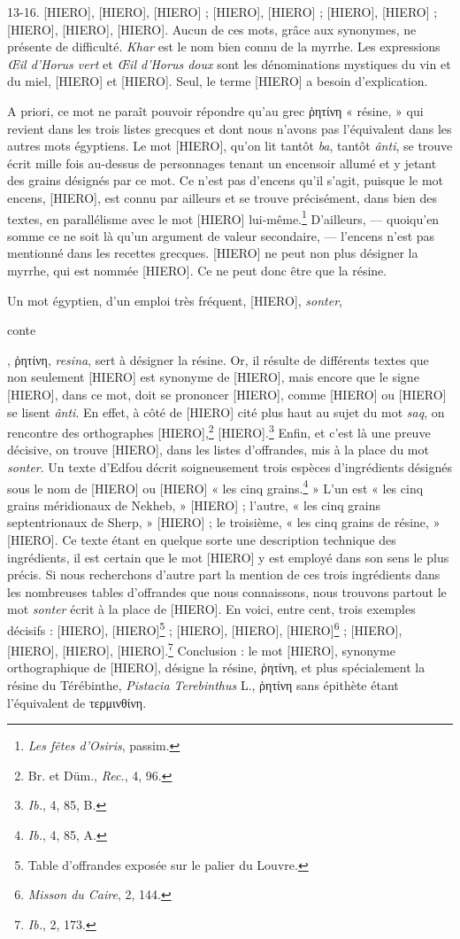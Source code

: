 \documentclass[a4paper, 11pt, oneside, landscape]{article}
\begin{document}
13-16. [HIERO], [HIERO], [HIERO] ; [HIERO], [HIERO] ; [HIERO], [HIERO] ; [HIERO], [HIERO], [HIERO]. Aucun de ces mots, grâce aux synonymes, ne présente de difficulté. \emph{Khar} est le nom bien connu de la myrrhe. Les expressions \emph{Œil d'Horus vert} et \emph{Œil d'Horus doux} sont les dénominations mystiques du vin et du miel, [HIERO] et [HIERO]. Seul, le terme [HIERO] a besoin d'explication.

A priori, ce mot ne paraît pouvoir répondre qu'au grec ῥητίνη « résine, » qui revient dans les trois listes grecques et dont nous n'avons pas l'équivalent dans les autres mots égyptiens. Le mot [HIERO], qu'on lit tantôt \emph{ba}, tantôt \emph{ânti}, se trouve écrit mille fois au-dessus de personnages tenant un encensoir allumé et y jetant des grains désignés par ce mot. Ce n'est pas d'encens qu'il s'agit, puisque le mot encens, [HIERO], est connu par ailleurs et se trouve précisément, dans bien des textes, en parallélisme avec le mot [HIERO] lui-même.\footnote{\emph{Les fêtes d'Osiris}, passim.} D'ailleurs, --- quoiqu'en somme ce ne soit là qu'un argument de valeur secondaire, --- l'encens n'est pas mentionné dans les recettes grecques. [HIERO] ne peut non plus désigner la myrrhe, qui est nommée [HIERO]. Ce ne peut donc être que la résine.

Un mot égyptien, d'un emploi très fréquent, [HIERO], \emph{sonter}, \begin{coptic}conte\end{coptic}, ῥητίνη, \emph{resina}, sert à désigner la résine. Or, il résulte de différents textes que non seulement [HIERO] est synonyme de [HIERO], mais encore que le signe [HIERO], dans ce mot, doit se prononcer [HIERO], comme [HIERO] ou [HIERO] se lisent \emph{ânti}. En effet, à côté de [HIERO] cité plus haut au sujet du mot \emph{saq}, on rencontre des orthographes [HIERO],\footnote{Br. et Düm., \emph{Rec.}, 4, 96.} [HIERO].\footnote{\emph{Ib.}, 4, 85, B.} Enfin, et c'est là une preuve décisive, on trouve [HIERO], dans les listes d'offrandes, mis à la place du mot \emph{sonter}. Un texte d'Edfou décrit soigneusement trois espèces d'ingrédients désignés sous le nom de [HIERO] ou [HIERO] « les cinq grains.\footnote{\emph{Ib.}, 4, 85, A.} » L'un est « les cinq grains méridionaux de Nekheb, » [HIERO] ; l'autre, « les cinq grains septentrionaux de Sherp, » [HIERO] ; le troisième, « les cinq grains de résine, » [HIERO]. Ce texte étant en quelque sorte une description technique des ingrédients, il est certain que le mot [HIERO] y est employé dans son sens le plus précis. Si nous recherchons d'autre part la mention de ces trois ingrédients dans les nombreuses tables d'offrandes que nous connaissons, nous trouvons partout le mot \emph{sonter} écrit à la place de [HIERO]. En voici, entre cent, trois exemples décisifs : [HIERO], [HIERO]\footnote{Table d'offrandes exposée sur le palier du Louvre.} ; [HIERO], [HIERO], [HIERO]\footnote{\emph{Misson du Caire}, 2, 144.} ; [HIERO], [HIERO], [HIERO], [HIERO].\footnote{\emph{Ib.}, 2, 173.} Conclusion : le mot [HIERO], synonyme orthographique de [HIERO], désigne la résine, ῥητίνη, et plus spécialement la résine du Térébinthe, \emph{Pistacia Terebinthus} L., ῥητίνη sans épithète étant l'équivalent de τερμινθίνη.
\clearpage
\end{document}
